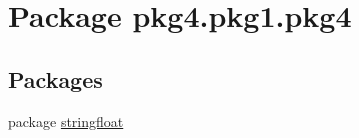 \hypertarget{namespacepkg4_1_1pkg1_1_1pkg4}{}\section{Package pkg4.\+pkg1.\+pkg4}
\label{namespacepkg4_1_1pkg1_1_1pkg4}
\subsection*{Packages}
\begin{DoxyCompactItemize}
\item 
package \mbox{\hyperlink{namespacepkg4_1_1pkg1_1_1pkg4_1_1stringfloat}{stringfloat}}
\end{DoxyCompactItemize}
